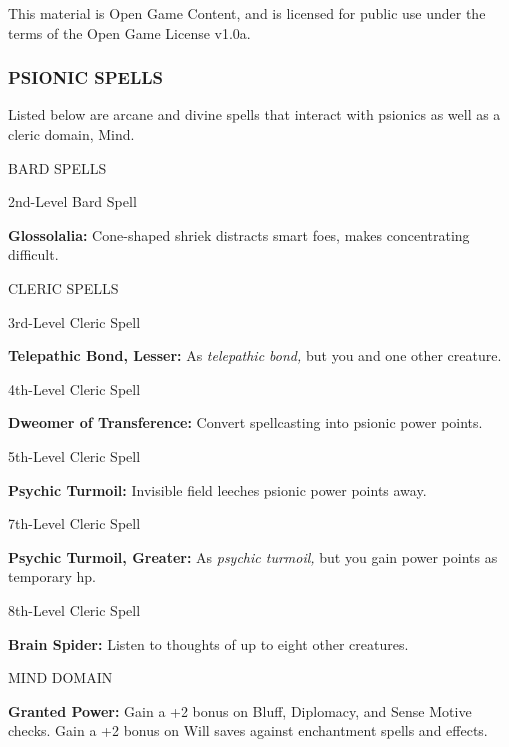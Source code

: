 \documentclass{article}
\begin{document}
This material is Open Game Content, and is licensed for public use under the terms 
of the Open Game License v1.0a.

\subsubsection*{{\LARGE{}PSIONIC SPELLS}}

\vspace{12pt}
Listed below are arcane and divine spells that interact with psionics as well as 
a cleric domain, Mind.

\vspace{12pt}
BARD SPELLS

\vspace{12pt}
2nd-Level Bard Spell

\textbf{Glossolalia:} Cone-shaped shriek distracts smart foes, makes concentrating 
difficult.

\vspace{12pt}
CLERIC SPELLS

\vspace{12pt}
3rd-Level Cleric Spell

\textbf{Telepathic Bond, Lesser:} As \textit{telepathic bond, }but you and one 
other creature.

\vspace{12pt}
4th-Level Cleric Spell

\textbf{Dweomer of Transference:} Convert spellcasting into psionic power points.

\vspace{12pt}
5th-Level Cleric Spell

\textbf{Psychic Turmoil:} Invisible field leeches psionic power points away.

\vspace{12pt}
7th-Level Cleric Spell

\textbf{Psychic Turmoil, Greater:} As \textit{psychic turmoil, }but you gain power 
points as temporary hp.

\vspace{12pt}
8th-Level Cleric Spell

\textbf{Brain Spider:} Listen to thoughts of up to eight other creatures.

\vspace{12pt}
MIND DOMAIN

\textbf{Granted Power:} Gain a +2 bonus on Bluff, Diplomacy, and Sense Motive checks. 
Gain a +2 bonus on Will saves against enchantment spells and effects.
\end{document}
